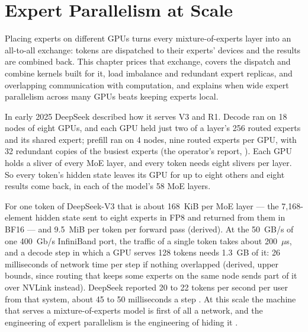 \chapter{Expert Parallelism at Scale}\label{ch:expert-parallelism}

\begin{ChapterIntent}
Placing experts on different GPUs turns every mixture-of-experts layer
into an all-to-all exchange: tokens are dispatched to their experts' devices
and the results are combined back. This chapter prices that exchange, covers
the dispatch and combine kernels built for it, load imbalance and redundant
expert replicas, and overlapping communication with computation, and explains
when wide expert parallelism across many GPUs beats keeping experts
local.
\end{ChapterIntent}


In early 2025 DeepSeek described how it serves V3 and R1. Decode ran on 18
nodes of eight GPUs, and each GPU held just two of a layer's 256 routed experts
and its shared expert; prefill ran on 4 nodes, nine routed experts per GPU, with
32 redundant copies of the busiest experts (the operator's report,
\cite{deepseek2025inference}). Each GPU holds a sliver of every MoE layer, and
every token needs eight slivers per layer. So every token's hidden state leaves
its GPU for up to eight others and eight results come back, in each of the
model's 58 MoE layers.

For one token of DeepSeek-V3 that is about 168~KiB per MoE layer --- the
7,168-element hidden state sent to eight experts in FP8 and returned from them
in BF16 --- and 9.5~MiB per token per forward pass (derived). At the 50~GB/s of
one 400~Gb/s InfiniBand port, the traffic of a single token takes about
200~$\mu$s, and a decode step in which a GPU serves 128 tokens needs 1.3~GB of
it: 26 milliseconds of network time per step if nothing overlapped (derived,
upper bounds, since routing that keeps some experts on the same node sends part
of it over NVLink instead). DeepSeek reported 20 to 22 tokens per second per
user from that system, about 45 to 50 milliseconds a step
\cite{deepseek2025inference}. At this scale the machine that serves a
mixture-of-experts model is first of all a network, and the engineering of
expert parallelism is the engineering of hiding it
.

